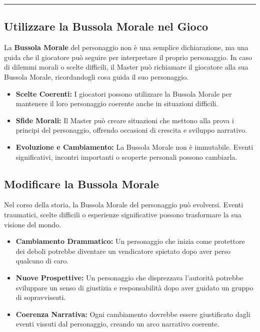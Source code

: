 \documentclass[../manuale_main.tex]{subfiles}
\begin{document}
\vspace{0.5cm}
\rule{\textwidth}{0.4pt}
\vspace{0.5cm}

\subsection{Utilizzare la Bussola Morale nel Gioco}
La \textbf{Bussola Morale} del personaggio non è una semplice dichiarazione, ma una guida che il giocatore può seguire per interpretare il proprio personaggio. In caso di dilemmi morali o scelte difficili, il Master può richiamare il giocatore alla sua Bussola Morale, ricordandogli cosa guida il suo personaggio.

\begin{itemize}
    \item \textbf{Scelte Coerenti:} I giocatori possono utilizzare la Bussola Morale per mantenere il loro personaggio coerente anche in situazioni difficili.
    \item \textbf{Sfide Morali:} Il Master può creare situazioni che mettono alla prova i principi del personaggio, offrendo occasioni di crescita e sviluppo narrativo.
    \item \textbf{Evoluzione e Cambiamento:} La Bussola Morale non è immutabile. Eventi significativi, incontri importanti o scoperte personali possono cambiarla.
\end{itemize}

\vspace{0.3cm}

\subsection{Modificare la Bussola Morale}
Nel corso della storia, la Bussola Morale del personaggio può evolversi. Eventi traumatici, scelte difficili o esperienze significative possono trasformare la sua visione del mondo.

\begin{itemize}
    \item \textbf{Cambiamento Drammatico:} Un personaggio che inizia come protettore dei deboli potrebbe diventare un vendicatore spietato dopo aver perso qualcuno di caro.
    \item \textbf{Nuove Prospettive:} Un personaggio che disprezzava l'autorità potrebbe sviluppare un senso di giustizia e responsabilità dopo aver guidato un gruppo di sopravvissuti.
    \item \textbf{Coerenza Narrativa:} Ogni cambiamento dovrebbe essere giustificato dagli eventi vissuti dal personaggio, creando un arco narrativo coerente.
\end{itemize}
\end{document}

